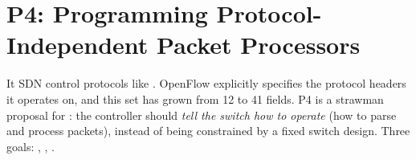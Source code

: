 \chapter{P4: Programming Protocol-Independent Packet Processors}

\begin{keybox}
 It  SDN control protocols like . OpenFlow explicitly specifies the protocol headers it operates on, and this set has grown from 12 to 41 fields. P4 is a strawman proposal for : the controller should \emph{tell the switch how to operate} (how to parse and process packets), instead of being constrained by a fixed switch design. Three goals: , , .
\end{keybox}

